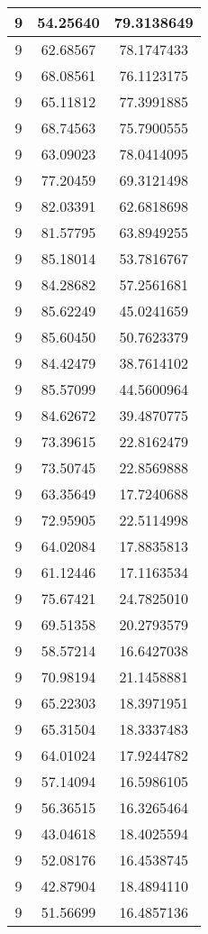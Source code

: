 \documentclass[
]{book}
\begin{document}
\begin{tabular}{c|c|c}
\hline
9 & 54.25640 & 79.3138649\\
\hline
9 & 62.68567 & 78.1747433\\
\hline
9 & 68.08561 & 76.1123175\\
\hline
9 & 65.11812 & 77.3991885\\
\hline
9 & 68.74563 & 75.7900555\\
\hline
9 & 63.09023 & 78.0414095\\
\hline
9 & 77.20459 & 69.3121498\\
\hline
9 & 82.03391 & 62.6818698\\
\hline
9 & 81.57795 & 63.8949255\\
\hline
9 & 85.18014 & 53.7816767\\
\hline
9 & 84.28682 & 57.2561681\\
\hline
9 & 85.62249 & 45.0241659\\
\hline
9 & 85.60450 & 50.7623379\\
\hline
9 & 84.42479 & 38.7614102\\
\hline
9 & 85.57099 & 44.5600964\\
\hline
9 & 84.62672 & 39.4870775\\
\hline
9 & 73.39615 & 22.8162479\\
\hline
9 & 73.50745 & 22.8569888\\
\hline
9 & 63.35649 & 17.7240688\\
\hline
9 & 72.95905 & 22.5114998\\
\hline
9 & 64.02084 & 17.8835813\\
\hline
9 & 61.12446 & 17.1163534\\
\hline
9 & 75.67421 & 24.7825010\\
\hline
9 & 69.51358 & 20.2793579\\
\hline
9 & 58.57214 & 16.6427038\\
\hline
9 & 70.98194 & 21.1458881\\
\hline
9 & 65.22303 & 18.3971951\\
\hline
9 & 65.31504 & 18.3337483\\
\hline
9 & 64.01024 & 17.9244782\\
\hline
9 & 57.14094 & 16.5986105\\
\hline
9 & 56.36515 & 16.3265464\\
\hline
9 & 43.04618 & 18.4025594\\
\hline
9 & 52.08176 & 16.4538745\\
\hline
9 & 42.87904 & 18.4894110\\
\hline
9 & 51.56699 & 16.4857136\\

\end{tabular}
\end{document}
